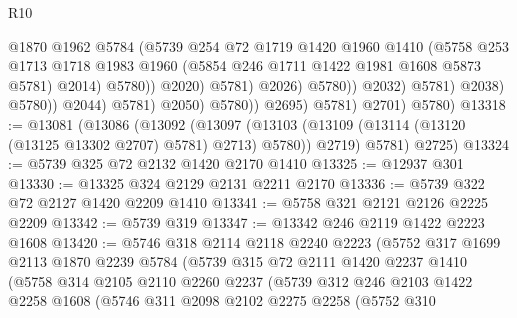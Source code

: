 \begin{lexlean}{R10}
\begin{coremodule}
                                            @1870
                                            @1962
                                            @5784
                                            (@5739
                                              @254
                                              @72
                                              @1719
                                              @1420
                                              @1960
                                              @1410
                                              (@5758
                                                @253
                                                @1713
                                                @1718
                                                @1983
                                                @1960
                                                (@5854 @246 @1711 @1422 @1981 @1608 @5873 @5781)
                                                @2014)
                                              @5780))
                                          @2020)
                                        @5781)
                                      @2026)
                                    @5780))
                                @2032)
                              @5781)
                            @2038)
                          @5780))
                      @2044)
                    @5781)
                  @2050)
                @5780))
            @2695)
          @5781)
        @2701)
      @5780)
@13318 := @13081
    (@13086
      (@13092
        (@13097 (@13103 (@13109 (@13114 (@13120 (@13125 @13302 @2707) @5781) @2713) @5780)) @2719)
        @5781)
      @2725)
@13324 := @5739 @325 @72 @2132 @1420 @2170 @1410
@13325 := @12937 @301
@13330 := @13325 @324 @2129 @2131 @2211 @2170
@13336 := @5739 @322 @72 @2127 @1420 @2209 @1410
@13341 := @5758 @321 @2121 @2126 @2225 @2209
@13342 := @5739 @319
@13347 := @13342 @246 @2119 @1422 @2223 @1608
@13420 := @5746
    @318
    @2114
    @2118
    @2240
    @2223
    (@5752
      @317
      @1699
      @2113
      @1870
      @2239
      @5784
      (@5739
        @315
        @72
        @2111
        @1420
        @2237
        @1410
        (@5758
          @314
          @2105
          @2110
          @2260
          @2237
          (@5739
            @312
            @246
            @2103
            @1422
            @2258
            @1608
            (@5746
              @311
              @2098
              @2102
              @2275
              @2258
              (@5752
                @310

\end{coremodule}
\end{lexlean}
